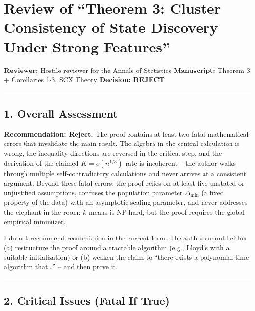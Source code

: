 \documentclass[
  12pt,
]{article}
\author{SCX}
\date{2026}
\begin{document}
\section{Review of ``Theorem 3: Cluster Consistency of State Discovery
Under Strong
Features''}\label{review-of-theorem-3-cluster-consistency-of-state-discovery-under-strong-features}

\textbf{Reviewer:} Hostile reviewer for the Annals of Statistics
\textbf{Manuscript:} Theorem 3 + Corollaries 1-3, SCX Theory
\textbf{Decision: REJECT}

\begin{center}\rule{0.5\linewidth}{0.5pt}\end{center}

\subsection{1. Overall Assessment}\label{overall-assessment}

\textbf{Recommendation: Reject.} The proof contains at least two fatal
mathematical errors that invalidate the main result. The algebra in the
central calculation is wrong, the inequality directions are reversed in
the critical step, and the derivation of the claimed \(K = o(n^{1/3})\)
rate is incoherent -- the author walks through multiple
self-contradictory calculations and never arrives at a consistent
argument. Beyond these fatal errors, the proof relies on at least five
unstated or unjustified assumptions, confuses the population parameter
\(\Delta_{\min}\) (a fixed property of the data) with an asymptotic
scaling parameter, and never addresses the elephant in the room:
\(k\)-means is NP-hard, but the proof requires the global empirical
minimizer.

I do not recommend resubmission in the current form. The authors should
either (a) restructure the proof around a tractable algorithm (e.g.,
Lloyd's with a suitable initialization) or (b) weaken the claim to
``there exists a polynomial-time algorithm that\ldots{}'' -- and then
prove it.

\begin{center}\rule{0.5\linewidth}{0.5pt}\end{center}

\subsection{2. Critical Issues (Fatal If
True)}\label{critical-issues-fatal-if-true}
\end{document}
